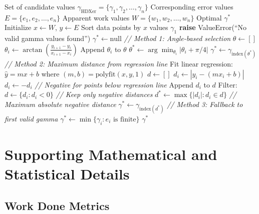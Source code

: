 \begin{algorithm}[htbp]
\caption{Curve-of-the-knee $\gamma_\text{HDXer}$ optimisation}
\label{alg:valdx-knee}
\footnotesize
\begin{algorithmic}[1]
\Require Set of candidate values $\gamma_\text{HDXer}= \{\gamma_1, \gamma_2, \ldots, \gamma_n\}$
\Require Corresponding error values $E = \{e_1, e_2, \ldots, e_n\}$
\Require Apparent work values $W = \{w_1, w_2, \ldots, w_n\}$
\Ensure Optimal $\gamma^*$
\State Initialize $x \leftarrow W$, $y \leftarrow E$
\State Sort data points by $x$ values
    \State \Return $\gamma_1$
    \State \textbf{raise} ValueError(``No valid gamma values found'')
\EndIf
\State $\gamma^* \leftarrow \text{null}$
\State \textit{// Method 1: Angle-based selection}
\State $\theta \leftarrow []$
    \State $\theta_i \leftarrow \arctan\left(\frac{y_{i+1} - y_i}{x_{i+1} - x_i}\right)$
    \State Append $\theta_i$ to $\theta$
\EndFor
\If{$\theta \neq []$}
    \State $\theta^* \leftarrow \arg\min_{\theta_i} |\theta_i + \pi/4|$
    \State $\gamma^* \leftarrow \gamma_{\text{index}(\theta^*)}$
\EndIf
{}
    \State \textit{// Method 2: Maximum distance from regression line}
    \State Fit linear regression: $\hat{y} = mx + b$ where $(m, b) = \text{polyfit}(x, y, 1)$
    \State $d \leftarrow []$
        \State $d_i \leftarrow |y_i - (mx_i + b)|$
            \State $d_i \leftarrow -d_i$ \textit{// Negative for points below regression line}
        \EndIf
        \State Append $d_i$ to $d$
    \EndFor
    \State Filter: $d \leftarrow \{d_i : d_i < 0\}$ \textit{// Keep only negative distances}
        \State $d^* \leftarrow \max\{|d_i| : d_i \in d\}$ \textit{// Maximum absolute negative distance}
        \State $\gamma^* \leftarrow \gamma_{\text{index}(d^*)}$
    \EndIf
\EndIf
{}
    \State \textit{// Method 3: Fallback to first valid gamma}
    \State $\gamma^* \leftarrow \min\{\gamma_i : e_i \text{ is finite}\}$
\EndIf
\State \Return $\gamma^*$
\end{algorithmic}
\end{algorithm}

\section{Supporting Mathematical and Statistical Details}
\label{app:valdx-mathematics}

\subsection{Work Done Metrics}
\label{app:valdx-work-definitions}

